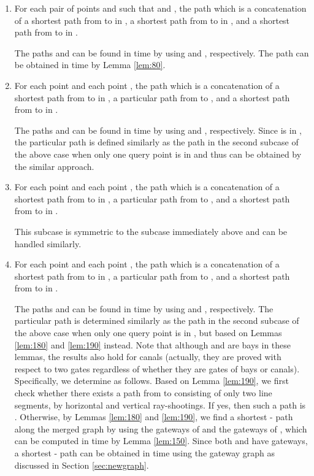 \documentclass[english,runningheads,11pt]{llncs}
\newenvironment{proof}{\noindent {\textbf{Proof:}}\rm}{\hfill \rm}
\begin{document}
\begin{proof}
\begin{description}
\begin{enumerate}
\item
For each pair of points  and  such that  and ,
the path which is a concatenation of a shortest path  from  to 
in , a shortest path from  to  in , and a shortest path  from  to  in .

The paths  and  can be found in
 time by using  and , respectively.
The path  can be obtained in
 time by Lemma \ref{lem:80}.

\item
For each point  and each point , the path
which is a concatenation of a shortest path from  to  in ,
a particular path  from  to , and a shortest
path from  to  in .

The paths  and  can be found in
 time by using  and , respectively.
Since  is in ,
the particular path  is defined similarly as
the path  in the second subcase of
the above case when only one query point  is in 
and thus can be obtained by the similar approach.

\item
For each point  and each point
, the path which is a concatenation
of a shortest path from  to  in , a particular path
 from  to , and a shortest path from  to
 in .

This subcase is symmetric to the subcase immediately above and can be handled similarly.

\item
For each point  and each point , the path
which is a concatenation of a shortest path from  to  in , a particular path  from  to , and a shortest path from  to  in .

The paths  and  can be found in
 time by using  and , respectively.
The particular path  is determined similarly as the path
 in the second subcase of the above case when only
one query point  is in , but based on Lemmas \ref{lem:180} and
\ref{lem:190} instead. Note that although  and  are bays in
these lemmas, the results also hold for canals (actually, they
are proved with respect to two gates regardless of whether they are gates of
bays or canals). Specifically, we determine  as follows.
Based on Lemma \ref{lem:190}, we first check whether there exists a
path from  to  consisting of only two line segments, by
horizontal and vertical ray-shootings. If yes, then such a path is
. Otherwise, by Lemmas \ref{lem:180} and \ref{lem:190}, we
find a shortest - path along the merged graph 
by using the gateways of  and the gateways of , which
can be computed in  time by Lemma \ref{lem:150}.
Since both  and  have
 gateways, a shortest - path can be obtained
in  time using the gateway graph as discussed in Section \ref{sec:newgraph}.
\end{enumerate}


\end{description}
\end{proof}
\end{document}
